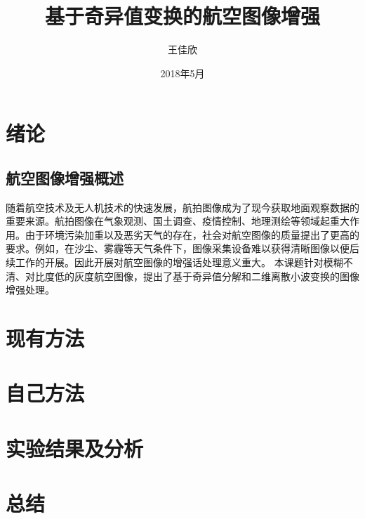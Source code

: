 \documentclass[12pt]{book}
\title{基于奇异值变换的航空图像增强}
\author{王佳欣}
\date{2018年5月}
\begin{document}
	\maketitle	 	
	\tableofcontents
	
	\chapter{绪论}
		\section{航空图像增强概述}
		随着航空技术及无人机技术的快速发展，航拍图像成为了现今获取地面观察数据的重要来源。航拍图像在气象观测、国土调查、疫情控制、地理测绘等领域起重大作用。由于环境污染加重以及恶劣天气的存在，社会对航空图像的质量提出了更高的要求。例如，在沙尘、雾霾等天气条件下，图像采集设备难以获得清晰图像以便后续工作的开展。因此开展对航空图像的增强话处理意义重大。
		本课题针对模糊不清、对比度低的灰度航空图像，提出了基于奇异值分解和二维离散小波变换的图像增强处理。

	\chapter{现有方法}

	\chapter{自己方法}

	\chapter{实验结果及分析}

	\chapter{总结}
\end{document}
